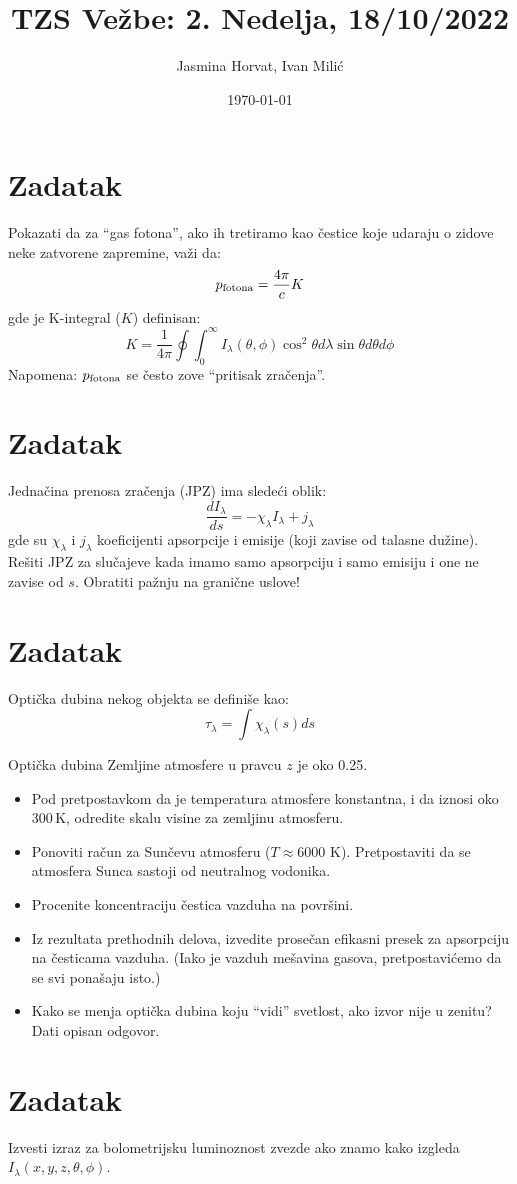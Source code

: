 \documentclass[12pt]{article}
\title{TZS Ve\v{z}be: 2. Nedelja, 18/10/2022}
\author{Jasmina Horvat, Ivan Mili\'{c}}
\date{\today}
\begin{document}
\maketitle

\section{Zadatak}
Pokazati da za ``gas fotona'', ako ih tretiramo kao \v{c}estice koje udaraju o zidove neke zatvorene zapremine, va\v{z}i da: 
\begin{equation}
p_{\rm fotona} = \frac{4\pi}{c} K
\end{equation}
gde je K-integral ($K$) definisan:
\begin{equation}
K = \frac{1}{4\pi}\oint \int_0^{\infty}I_\lambda(\theta,\phi)\cos^2 \theta d\lambda \sin \theta d \theta d \phi
\end{equation}
Napomena: $p_{\rm fotona}$ se \v{c}esto zove ``pritisak zra\v{c}enja''. 

\section{Zadatak}
Jedna\v{c}ina prenosa zra\v{c}enja (JPZ) ima slede\'{c}i oblik:
\begin{equation}
\frac{dI_\lambda}{ds} = -\chi_\lambda I_\lambda + j_\lambda
\end{equation}
gde su $\chi_\lambda$ i $j_\lambda$ koeficijenti apsorpcije i emisije (koji zavise od talasne du\v{z}ine). Re\v{s}iti JPZ za slu\v{c}ajeve kada imamo samo apsorpciju i samo emisiju i one ne zavise od $s$. Obratiti pa\v{z}nju na grani\v{c}ne uslove! 

\section{Zadatak}
Opti\v{c}ka dubina nekog objekta se defini\v{s}e kao: 
\begin{equation}
\tau_\lambda = \int \chi_\lambda (s) ds
\end{equation}

Opti\v{c}ka dubina Zemljine atmosfere u pravcu $z$ je oko 0.25. 
\begin{itemize}
    \item Pod pretpostavkom da je temperatura atmosfere konstantna, i da iznosi oko 300\,K, odredite skalu visine za zemljinu atmosferu.
    \item Ponoviti ra\v{c}un za Sun\v{c}evu atmosferu ($T \approx 6000$ K). Pretpostaviti da se atmosfera Sunca sastoji od neutralnog vodonika. 
    \item Procenite koncentraciju \v{c}estica vazduha na povr\v{s}ini. 
    \item Iz rezultata prethodnih delova, izvedite prose\v{c}an efikasni presek za apsorpciju na \v{c}esticama vazduha. (Iako je vazduh me\v{s}avina gasova, pretpostavi\'{c}emo da se svi pona\v{s}aju isto.)
    \item Kako se menja opti\v{c}ka dubina koju ``vidi'' svetlost, ako izvor nije u zenitu? Dati opisan odgovor.
\end{itemize}

\section{Zadatak}

Izvesti izraz za bolometrijsku luminoznost zvezde ako znamo kako izgleda $I_\lambda(x,y,z,\theta,\phi)$.
\end{document}
